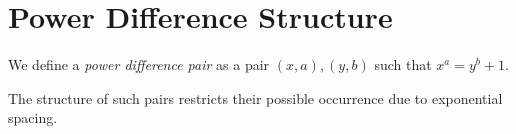 
\section{Power Difference Structure}
\begin{definition}
We define a \textit{power difference pair} as a pair \( (x,a), (y,b) \) such that \( x^a = y^b + 1 \).
\end{definition}

\begin{lemma}
The structure of such pairs restricts their possible occurrence due to exponential spacing.
\end{lemma}
